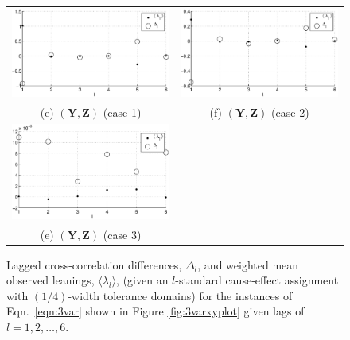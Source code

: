 \documentclass{article}[10pt]
\begin{document}
\begin{figure}[ht]
\begin{center}
\begin{tabular}{cc}
\includegraphics[scale=0.48]{NoisyMultiResponseExample_LandLCC_YZ1.eps} & \includegraphics[scale=0.48]{NoisyMultiResponseExample_LandLCC_YZ2.eps} \\
(e) $(\mathbf{Y},\mathbf{Z})$ (case 1) & (f) $(\mathbf{Y},\mathbf{Z})$ (case 2)\\
\includegraphics[scale=0.48]{NoisyMultiResponseExample_LandLCC_YZ3.eps} &  \\
(e) $(\mathbf{Y},\mathbf{Z})$ (case 3) & 
\end{tabular}
\end{center}
\caption{Lagged cross-correlation differences, $\Delta_l$, and weighted mean observed leanings, $\langle\lambda_l\rangle$, (given an $l$-standard cause-effect assignment with $(1/4)$-width tolerance domains) for the instances of Eqn.\ \ref{eqn:3var} shown in Figure \ref{fig:3varxyplot} given lags of $l=1,2,\ldots,6$.}
\label{fig:3varxyLandLCC}
\end{figure}
\end{document}
